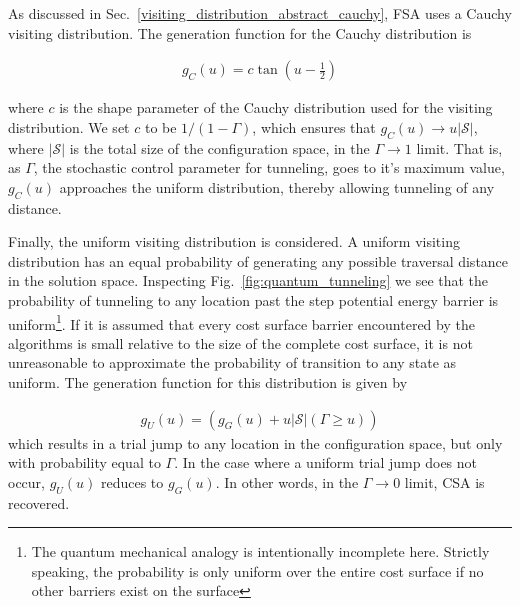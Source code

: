 \documentclass[11pt]{afthesis}
\begin{document}
	As discussed in Sec.~\ref{visiting_distribution_abstract_cauchy}, FSA uses a Cauchy visiting distribution. The generation function for the Cauchy distribution is
	
	\begin{align}\label{eq:cauchy_generation_fcn}
	g_{C}(u) =  c \tan\left(u-\frac{1}{2}\right)
	\end{align}
	
	\noindent where $c$ is the shape parameter of the Cauchy distribution used for the visiting distribution. We set $c$ to be $1/(1-\Gamma)$, which ensures that $g_{C}(u) \rightarrow u \left| \boldsymbol{\mathcal{S}}\right| $, where $\left| \boldsymbol{\mathcal{S}}\right|$ is the total size of the configuration space, in the $\Gamma \rightarrow 1$ limit. That is, as $\Gamma$, the stochastic control parameter for tunneling, goes to it's maximum value, $g_{C}(u)$ approaches the uniform distribution, thereby allowing tunneling of any distance.
	
	
	Finally, the uniform visiting distribution is considered. A uniform visiting distribution has an equal probability of generating any possible traversal distance in the solution space. Inspecting Fig.~\ref{fig:quantum_tunneling} we see that the probability of tunneling to any location past the step potential energy barrier is uniform\footnote{The quantum mechanical analogy is intentionally incomplete here. Strictly speaking, the probability is only uniform over the entire cost surface if no other barriers exist on the surface}. If it is assumed that every cost surface barrier encountered by the algorithms is small relative to the size of the complete cost surface, it is not unreasonable to approximate the probability of transition to any state as uniform. The generation function for this distribution is given by
	
	\begin{align}\label{eq:uniform_generation_fcn}
	g_{U}(u) = (g_{G}(u) +  u \left| \boldsymbol{\mathcal{S}} \right| (\Gamma\geq u))
	\end{align}
	\noindent which results in a trial jump to any location in the configuration space, but only with probability equal to $\Gamma$. In the case where a uniform trial jump does not occur, $g_{U}(u)$ reduces to $g_{G}(u)$. In other words, in the $\Gamma \rightarrow 0$ limit, CSA is recovered.
	
\end{document}
